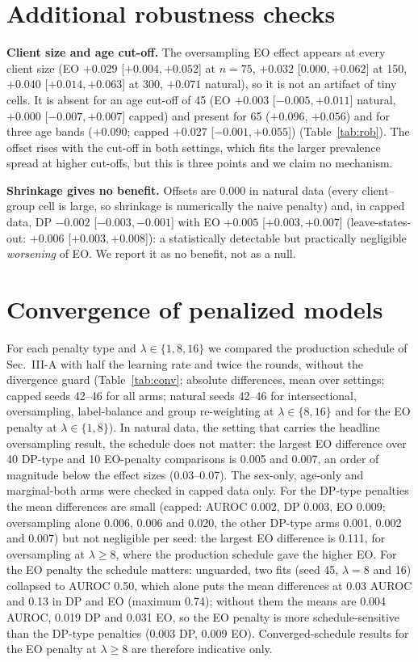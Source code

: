 \section{Additional robustness checks}
\label{app:robust}
\textbf{Client size and age cut-off.} The oversampling EO effect appears at every client size (EO $+0.029$ [$+0.004,+0.052$] at $n{=}75$, $+0.032$ [$0.000,+0.062$] at 150, $+0.040$ [$+0.014,+0.063$] at 300, $+0.071$ natural), so it is not an artifact of tiny cells. It is absent for an age cut-off of 45 (EO $+0.003$ [$-0.005,+0.011$] natural, $+0.000$ [$-0.007,+0.007$] capped) and present for 65 ($+0.096$, $+0.056$) and for three age bands ($+0.090$; capped $+0.027$ [$-0.001,+0.055$]) (Table~\ref{tab:rob}). The offset rises with the cut-off in both settings, which fits the larger prevalence spread at higher cut-offs, but this is three points and we claim no mechanism.

\textbf{Shrinkage gives no benefit.} Offsets are 0.000 in natural data (every client--group cell is large, so shrinkage is numerically the naive penalty) and, in capped data, DP $-0.002$ [$-0.003,-0.001$] with EO $+0.005$ [$+0.003,+0.007$] (leave-states-out: $+0.006$ [$+0.003,+0.008$]): a statistically detectable but practically negligible \emph{worsening} of EO. We report it as no benefit, not as a null.



\section{Convergence of penalized models}
\label{app:conv}
For each penalty type and $\lambda\in\{1,8,16\}$ we compared the production schedule of Sec.~III-A with half the learning rate and twice the rounds, without the divergence guard (Table~\ref{tab:conv}; absolute differences, mean over settings; capped seeds 42--46 for all arms; natural seeds 42--46 for intersectional, oversampling, label-balance and group re-weighting at $\lambda\in\{8,16\}$ and for the EO penalty at $\lambda\in\{1,8\}$). In natural data, the setting that carries the headline oversampling result, the schedule does not matter: the largest EO difference over 40 DP-type and 10 EO-penalty comparisons is 0.005 and 0.007, an order of magnitude below the effect sizes (0.03--0.07). The sex-only, age-only and marginal-both arms were checked in capped data only. For the DP-type penalties the mean differences are small (capped: AUROC 0.002, DP 0.003, EO 0.009; oversampling alone 0.006, 0.006 and 0.020, the other DP-type arms 0.001, 0.002 and 0.007) but not negligible per seed: the largest EO difference is 0.111, for oversampling at $\lambda\ge 8$, where the production schedule gave the higher EO. For the EO penalty the schedule matters: unguarded, two fits (seed 45, $\lambda{=}8$ and 16) collapsed to AUROC 0.50, which alone puts the mean differences at 0.03 AUROC and 0.13 in DP and EO (maximum 0.74); without them the means are 0.004 AUROC, 0.019 DP and 0.031 EO, so the EO penalty is more schedule-sensitive than the DP-type penalties (0.003 DP, 0.009 EO). Converged-schedule results for the EO penalty at $\lambda\ge 8$ are therefore indicative only.

